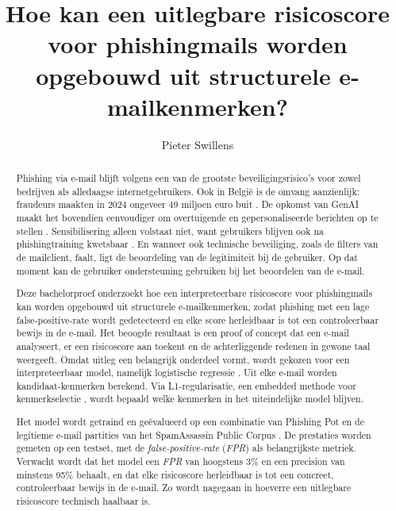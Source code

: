\documentclass{hogent-article}
\title{Hoe kan een uitlegbare risicoscore voor phishingmails worden opgebouwd uit structurele e-mailkenmerken?}
\author{Pieter Swillens}
\begin{document}
\begin{abstract}
Phishing via e-mail blijft volgens \textcite{Veit2025} een van de grootste beveiligingsrisico's voor zowel bedrijven als alledaagse internetgebruikers. Ook in België is de omvang aanzienlijk: fraudeurs maakten in 2024 ongeveer 49 miljoen euro buit \autocite{Febelfin2025}. De opkomst van GenAI maakt het bovendien eenvoudiger om overtuigende en gepersonaliseerde berichten op te stellen \autocite{SchmittFlechais2024}. Sensibilisering alleen volstaat niet, want gebruikers blijven ook na phishingtraining kwetsbaar \autocite{Marshall2024}. En wanneer ook technische beveiliging, zoals de filters van de mailclient, faalt, ligt de beoordeling van de legitimiteit bij de gebruiker. Op dat moment kan de gebruiker ondersteuning gebruiken bij het beoordelen van de e-mail.

Deze bachelorproef onderzoekt hoe een interpreteerbare risicoscore voor phishingmails kan worden opgebouwd uit structurele e-mailkenmerken, zodat phishing met een lage false-positive-rate wordt gedetecteerd en elke score herleidbaar is tot een controleerbaar bewijs in de e-mail. Het beoogde resultaat is een proof of concept dat een e-mail analyseert, er een risicoscore aan toekent en de achterliggende redenen in gewone taal weergeeft. Omdat uitleg een belangrijk onderdeel vormt, wordt gekozen voor een interpreteerbaar model, namelijk logistische regressie \autocite{Rudin2019}. Uit elke e-mail worden kandidaat-kenmerken berekend. Via L1-regularisatie, een embedded methode voor kenmerkselectie \autocite{Guyon2003}, wordt bepaald welke kenmerken in het uiteindelijke model blijven. 

Het model wordt getraind en geëvalueerd op een combinatie van Phishing Pot \autocite{PhishingPot} en de legitieme e-mail partities van het SpamAssassin Public Corpus . De prestaties worden gemeten op een testset, met de \emph{false-positive-rate} (\emph{FPR}) als belangrijkste metriek. Verwacht wordt dat het model een \emph{FPR} van hoogstens 3\% en een precision van minstens 95\% behaalt, en dat elke risicoscore herleidbaar is tot een concreet, controleerbaar bewijs in de e-mail. Zo wordt nagegaan in hoeverre een uitlegbare risicoscore technisch haalbaar is.
\end{abstract}

\tableofcontents


\printbibliography[heading=bibintoc]
\end{document}
